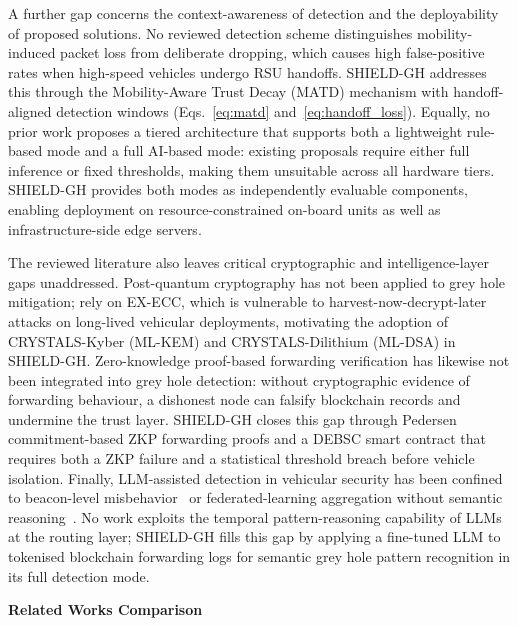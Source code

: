 \documentclass[12pt, a4paper]{report}
\begin{document}
A further gap concerns the context-awareness of detection and the
deployability of proposed solutions.
No reviewed detection scheme distinguishes mobility-induced packet loss from
deliberate dropping, which causes high false-positive rates when high-speed
vehicles undergo RSU handoffs.
SHIELD-GH addresses this through the Mobility-Aware Trust Decay (MATD)
mechanism with handoff-aligned detection windows
(Eqs.~\eqref{eq:matd} and~\eqref{eq:handoff_loss}).
Equally, no prior work proposes a tiered architecture that supports both a
lightweight rule-based mode and a full AI-based mode: existing proposals
require either full inference or fixed thresholds, making them unsuitable
across all hardware tiers.
SHIELD-GH provides both modes as independently evaluable components,
enabling deployment on resource-constrained on-board units as well as
infrastructure-side edge servers.

The reviewed literature also leaves critical cryptographic and
intelligence-layer gaps unaddressed.
Post-quantum cryptography has not been applied to grey hole mitigation;
\cite{ahmed2024blockchain} rely on EX-ECC, which is vulnerable to
harvest-now-decrypt-later attacks on long-lived vehicular deployments,
motivating the adoption of CRYSTALS-Kyber (ML-KEM) and
CRYSTALS-Dilithium (ML-DSA) in SHIELD-GH\@.
Zero-knowledge proof-based forwarding verification has likewise not been
integrated into grey hole detection: without cryptographic evidence of
forwarding behaviour, a dishonest node can falsify blockchain records and
undermine the trust layer.
SHIELD-GH closes this gap through Pedersen commitment-based ZKP forwarding
proofs and a DEBSC smart contract that requires both a ZKP failure and a
statistical threshold breach before vehicle isolation.
Finally, LLM-assisted detection in vehicular security has been confined to
beacon-level misbehavior~\cite{hamhoum2024mistralbsm} or federated-learning
aggregation without semantic reasoning~\cite{ahsan2024flbert}.
No work exploits the temporal pattern-reasoning capability of LLMs at the
routing layer; SHIELD-GH fills this gap by applying a fine-tuned LLM to
tokenised blockchain forwarding logs for semantic grey hole pattern
recognition in its full detection mode.


\vspace{0.5em}
\noindent\textbf{Related Works Comparison}
\end{document}
